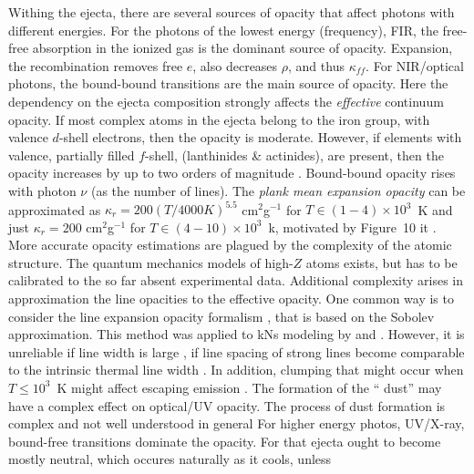 Withing the ejecta, there are several sources of opacity that affect photons with
different energies.
%
For the photons of the lowest energy (frequency), \ac{FIR}, the free-free absorption 
in the ionized gas is the dominant source of opacity. Expansion, the recombination removes 
free $e$, also decreases $\rho$, and thus $\kappa_{ff}$.
%
For \ac{NIR}/optical photons, the bound-bound transitions are the main source of opacity. 
Here the dependency on the ejecta composition strongly affects the \textit{effective} 
continuum opacity. If most complex atoms in the ejecta belong to the iron group, with 
valence $d$-shell electrons, then the opacity is moderate. However, if elements with 
valence, partially filled $f$-shell, (lanthinides \& actinides), are present, then the 
opacity increases by up to two orders of magnitude
\citep{Kasen:2013xka,Tanaka:2013ana,Fontes:2015,Fontes:2017zfb}. 
Bound-bound opacity rises with photon $\nu$ (as the number of lines).
%
The \textit{plank mean expansion opacity} can be approximated as 
$\kappa_r = 200 (T/4000K)^{5.5}$ cm$^2$g$^{-1}$ for $T\in(1-4)\times10^3$~K and just 
$\kappa_r = 200$ cm$^2$g$^{-1}$ for $T\in(4-10)\times10^{3}$~k, motivated by 
Figure~10 it \citet{Kasen:2013xka}. More accurate opacity estimations are plagued by the 
complexity of the atomic structure. The quantum mechanics models of high-$Z$ atoms exists, 
but has to be calibrated to the so far absent experimental data.
%
Additional complexity arises in approximation the line opacities to the effective opacity.
One common way is to consider the line expansion opacity formalism \citep{Pinto:2000}, that is 
based on the Sobolev approximation. This method was applied to \acp{kN} modeling by 
\citet{Barnes:2013wka} and \citet{Tanaka:2013ana}. However, it is unreliable if line width is 
large \ie, if line spacing of strong lines become comparable to the intrinsic thermal line width 
\citep{Kasen:2013xka,Fontes:2015,Fontes:2017zfb}. 
%
In addition, clumping that might occur when $T\leq10^3$~K might affect escaping 
emission \citep{Takami:2014oqa}. The formation of the ``\rproc{} dust'' may have a complex 
effect on optical/\ac{UV} opacity. The process of dust formation is complex and not 
well understood in general \citep{Cherchneff:2009sj,Lazzati:2016}
%
For higher energy photos, \ac{UV}/X-ray, bound-free transitions dominate the opacity. 
For that ejecta ought to become mostly neutral, which occures naturally as it cools, unless 
